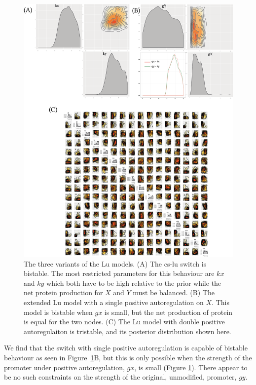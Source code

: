 \begin{figure}[p]
\centerfloat
\includegraphics[width=1.3\textwidth]{../../chapters/chapterStabilityFinder/images/lu_paper_post.png}
\caption[Posterior distributions of the Lu switches]{ \label{fig:fig3}The three variants of the Lu models. (A) The \acrshort{cs-lu} switch is bistable. The most restricted parameters for this behaviour are $kx$ and $ky$ which both have to be high relative to the prior while the net protein production for $X$ and $Y$ must be balanced. (B) The extended Lu model with a single positive autoregulation on $X$. This model is bistable when $gx$ is small, but the net production of protein is equal for the two nodes. (C) The Lu model with double positive autoregulaiton is tristable, and its posterior distribution shown here. }

\end{figure}
\clearpage

We find that the switch with single positive autoregulation is capable of bistable behaviour as seen in Figure~\ref{fig:fig3}B, but this is only possible when the strength of the promoter under positive autoregulation, $gx$, is small (Figure \ref{fig:fig3}). There appear to be no such constraints on the strength of the original, unmodified, promoter, $gy$.  

